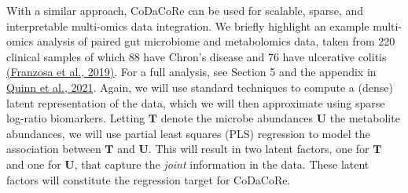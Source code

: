 \documentclass[
]{article}
\begin{document}
With a similar approach, CoDaCoRe can be used for scalable, sparse, and
interpretable multi-omics data integration. We briefly highlight an
example multi-omics analysis of paired gut microbiome and metabolomics
data, taken from 220 clinical samples of which 88 have Chron's disease
and 76 have ulcerative colitis
\href{https://www.nature.com/articles/s41564-018-0306-4}{(Franzosa et
al., 2019)}. For a full analysis, see Section 5 and the appendix in
\href{https://arxiv.org/abs/2104.07266}{Quinn et al., 2021}. Again, we
will use standard techniques to compute a (dense) latent representation
of the data, which we will then approximate using sparse log-ratio
biomarkers. Letting \(\mathbf T\) denote the microbe abundances
\(\mathbf U\) the metabolite abundances, we will use partial least
squares (PLS) regression to model the association between \(\mathbf T\)
and \(\mathbf U\). This will result in two latent factors, one for
\(\mathbf T\) and one for \(\mathbf U\), that capture the \emph{joint}
information in the data. These latent factors will constitute the
regression target for CoDaCoRe.
\end{document}
